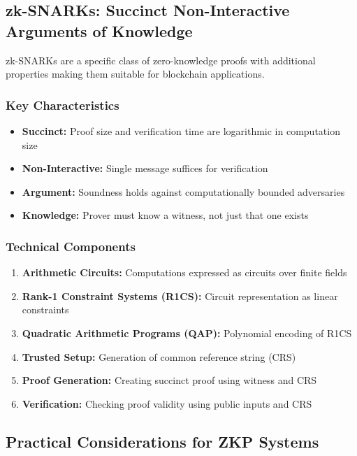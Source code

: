 \subsection{zk-SNARKs: Succinct Non-Interactive Arguments of Knowledge}

zk-SNARKs are a specific class of zero-knowledge proofs with additional properties making them suitable for blockchain applications.

\subsubsection{Key Characteristics}
\begin{itemize}
    \item \textbf{Succinct:} Proof size and verification time are logarithmic in computation size
    \item \textbf{Non-Interactive:} Single message suffices for verification
    \item \textbf{Argument:} Soundness holds against computationally bounded adversaries
    \item \textbf{Knowledge:} Prover must know a witness, not just that one exists
\end{itemize}

\subsubsection{Technical Components}
\begin{enumerate}
    \item \textbf{Arithmetic Circuits:} Computations expressed as circuits over finite fields
    \item \textbf{Rank-1 Constraint Systems (R1CS):} Circuit representation as linear constraints
    \item \textbf{Quadratic Arithmetic Programs (QAP):} Polynomial encoding of R1CS
    \item \textbf{Trusted Setup:} Generation of common reference string (CRS)
    \item \textbf{Proof Generation:} Creating succinct proof using witness and CRS
    \item \textbf{Verification:} Checking proof validity using public inputs and CRS
\end{enumerate}

\subsection{Practical Considerations for ZKP Systems}

